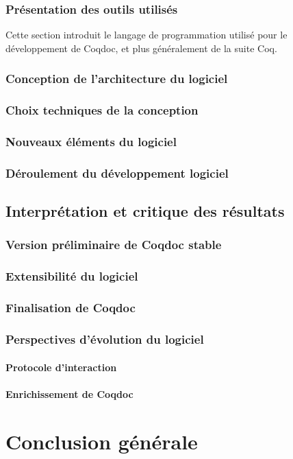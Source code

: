 \documentclass[a4paper, 11pt]{report}
\begin{document}
    \subsection{Présentation des outils utilisés}
    Cette section introduit le langage de programmation utilisé pour le
    développement de Coqdoc, et plus généralement de la suite Coq.
    \subsection{Conception de l'architecture du logiciel}
    \subsection{Choix techniques de la conception}
    \subsection{Nouveaux éléments du logiciel}
    \subsection{Déroulement du développement logiciel}
  \section{Interprétation et critique des résultats}
    \subsection{Version préliminaire de Coqdoc stable}
    \subsection{Extensibilité du logiciel}
    \subsection{Finalisation de Coqdoc}
    \subsection{Perspectives d'évolution du logiciel}
    \subsubsection{Protocole d'interaction}
    \subsubsection{Enrichissement de Coqdoc}
\chapter{Conclusion générale}

\end{document}
